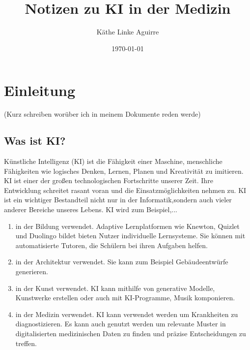 \documentclass{article}
\title{Notizen zu KI in der Medizin}
\author{Käthe Linke Aguirre}
\date{\today}
\begin{document}
\maketitle


    \tableofcontents

\newpage


\section {Einleitung}

(Kurz schreiben worüber ich in meinem Dokumente reden werde)

\subsection{Was ist KI?}
  
Künstliche Intelligenz (KI) ist die Fähigkeit einer Maschine, menschliche Fähigkeiten
wie logisches Denken, Lernen, Planen und Kreativität zu imitieren. KI ist einer der 
großen technologischen Fortschritte unserer Zeit. Ihre Entwicklung schreitet 
rasant voran und die Einsatzmöglichkeiten nehmen zu. KI ist ein wichtiger Bestandteil nicht nur in der 
Informatik,sondern auch vieler anderer Bereiche unseres Lebens. 
\newline
KI wird zum Beispiel,... 
\begin{enumerate}
    \item in der Bildung verwendet. Adaptive Lernplatformen wie Knewton, Quizlet und Duolingo bildet 
    bieten Nutzer individuelle Lernsysteme. Sie können mit automatisierte Tutoren, die Schülern bei 
    ihren Aufgaben helfen.
    \item in der Architektur verwendet. Sie kann zum Beispiel Gebäudeentwürfe generieren.
    \item in der Kunst verwendet. KI kann mithilfe von generative Modelle, Kunstwerke erstellen oder 
    auch mit KI-Programme, Musik komponieren.
    \item in der Medizin verwendet. KI kann verwendet werden um Krankheiten zu diagnostizieren. Es kann auch genutzt werden um relevante Muster in digitalisierten medizinischen 
    Daten zu finden und präzise Entscheidungen zu treffen.
\end{enumerate}
\end{document}
